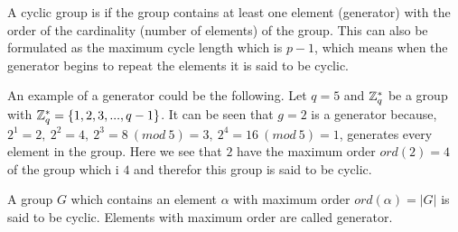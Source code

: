  A cyclic group is if the group contains at least one element (generator) with the order of the cardinality (number of elements) of the group. This can also be formulated as the maximum cycle length which is $p-1$, which means when the generator begins to repeat the elements it is said to be cyclic.

 An example of a generator could be the following. Let \begin{math}q=5\end{math} and \begin{math} \mathbb{Z}_q^*\end{math} be a group with \begin{math} \mathbb{Z}_q^* = \{1,2,3,...,q-1\}\end{math}. It can be seen that \begin{math} g=2\end{math} is a generator because,  \begin{math}2^1=2,\ 2^2=4,\ 2^3=8 \ (mod\ 5)=3,\ 2^4=16 \ (mod \ 5)=1 \end{math}, generates every element in the group. Here we see that $2$ have the maximum order $ord(2)=4$ of the group which i $4$ and therefor this group is said to be cyclic.

\begin{defi}
A group $G$ which contains an element $ \alpha $ with maximum order $ord( \alpha ) = |G|$ is said to be cyclic. Elements with maximum order are called generator.
\end{defi}

